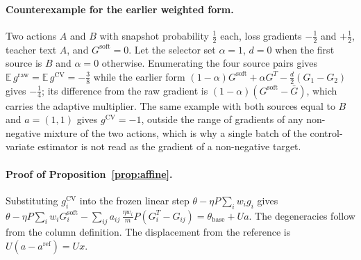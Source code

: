 \paragraph{Counterexample for the earlier weighted form.}
Two actions $A$ and $B$ with snapshot probability $\tfrac12$ each,
loss gradients $-\tfrac12$ and $+\tfrac12$, teacher text $A$, and
$G^{\mathrm{soft}}=0$. Let the selector set $\alpha=1$, $d=0$ when the
first source is $B$ and $\alpha=0$ otherwise. Enumerating the four
source pairs gives $\mathbb{E}\,g^{\mathrm{raw}}=\mathbb{E}\,g^{\mathrm{CV}}=-\tfrac38$
while the earlier form
$(1-\alpha)G^{\mathrm{soft}}+\alpha G^T-\tfrac{d}{2}(G_1-G_2)$ gives
$-\tfrac14$; its difference from the raw gradient is
$(1-\alpha)(G^{\mathrm{soft}}-\bar G)$, which carries the adaptive
multiplier. The same example with both sources equal to $B$ and
$a=(1,1)$ gives $g^{\mathrm{CV}}=-1$, outside the range of gradients
of any non-negative mixture of the two actions, which is why a single
batch of the control-variate estimator is not read as the gradient of
a non-negative target.

\paragraph{Proof of Proposition~\ref{prop:affine}.}
Substituting $g_i^{\mathrm{CV}}$ into the frozen linear step
$\theta-\eta P\sum_i w_ig_i$ gives
$\theta-\eta P\sum_i w_iG_i^{\mathrm{soft}}
-\sum_{ij}a_{ij}\,\tfrac{\eta w_i}{m}P(G_i^T-G_{ij})=\theta_{\mathrm{base}}+Ua$.
The degeneracies follow from the column definition. The displacement
from the reference is $U(a-a^{\mathrm{ref}})=Ux$.

